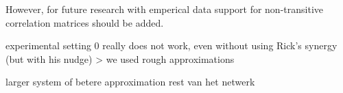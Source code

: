\documentclass[../main.tex]{subfiles}
\begin{document}
However, for future research with emperical data support for non-transitive correlation matrices should be added.

experimental setting 0 really does not work, even without using Rick's synergy (but with his nudge) > we used rough approximations %

larger system of betere approximation rest van het netwerk

\end{document}
